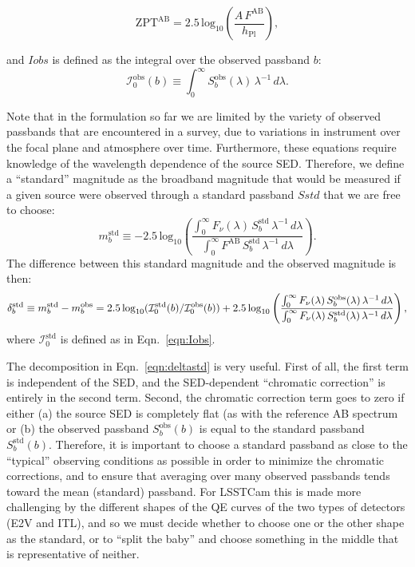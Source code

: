 \documentclass[SE,authoryear,lsstdraft,toc]{lsstdoc}
\newcommand{\mobs}{m_b^{\mathrm{obs}}}
\newcommand{\mstd}{m_b^{\mathrm{std}}}
\newcommand{\Sobs}{S_b^{\mathrm{obs}}}
\newcommand{\Sstd}{S_b^{\mathrm{std}}}
\newcommand{\Iobs}{\mathcal{I}_0^{\mathrm{obs}}}
\newcommand{\Istd}{\mathcal{I}_0^{\mathrm{std}}}
\begin{document}
\begin{equation}
\mathrm{ZPT}^{\mathrm{AB}} = 2.5\,\mathrm{log}_{10}
 \left (\frac{A\,F^{\mathrm{AB}}}{h_{\mathrm{Pl}}} \right ),
\end{equation}

and $Iobs$ is defined as the integral over the observed passband $b$:
%
\begin{equation}
\label{eqn:Iobs}
\Iobs(b) \equiv \int_0^\infty \Sobs(\lambda)\,\lambda^{-1}\,d\lambda.
\end{equation}
%

Note that in the formulation so far we are limited by the variety of observed
passbands that are encountered in a survey, due to variations in instrument
over the focal plane and atmosphere over time.  Furthermore, these equations
require knowledge of the wavelength dependence of the source SED.  Therefore,
we define a ``standard'' magnitude as the broadband magnitude that would be
measured if a given source were observed through a standard passband $Sstd$
that we are free to choose:
%
\begin{equation}
\mstd \equiv -2.5\,\mathrm{log}_{10} \left ( \frac{\int_0^\infty
  F_\nu(\lambda)\,\Sstd\,\lambda^{-1}\,d\lambda}{\int_0^\infty
  F^{\mathrm{AB}}\,\Sstd\,\lambda^{-1}\,d\lambda} \right ).
\end{equation}
%
The difference between this standard magnitude and the observed magnitude is
then:
%
\begin{equation}
\label{eqn:deltastd}
\delta_b^{\mathrm{std}} \equiv \mstd - \mobs\\
= 2.5\,\mathrm{log}_{10}(\Istd(b)/\Iobs(b))\\
+ 2.5\,\mathrm{log}_{10} \left ( \frac{\int_0^{\infty}
  F_\nu(\lambda)\,\Sobs(\lambda)\,\lambda^{-1}\,d\lambda}{\int_0^{\infty}
  F_\nu(\lambda)\,\Sstd(\lambda)\,\lambda^{-1}\,d\lambda} \right ),
\end{equation}
%
where $\Istd$ is defined as in Eqn.~\ref{eqn:Iobs}.

The decomposition in Eqn.~\ref{eqn:deltastd} is very useful.  First of all, the
first term is independent of the SED, and the SED-dependent ``chromatic
correction'' is entirely in the second term.  Second, the chromatic correction
term goes to zero if either (a) the source SED is completely flat (as with the
reference AB spectrum or (b) the observed passband $\Sobs(b)$ is equal to the
standard passband $\Sstd(b)$.  Therefore, it is important to choose a standard
passband as close to the ``typical'' observing conditions as possible in order
to minimize the chromatic corrections, and to ensure that averaging over many
observed passbands tends toward the mean (standard) passband.  For LSSTCam this
is made more challenging by the different shapes of the QE curves of the two
types of detectors (E2V and ITL), and so we must decide whether to choose one
or the other shape as the standard, or to ``split the baby'' and choose
something in the middle that is representative of neither.
\end{document}
